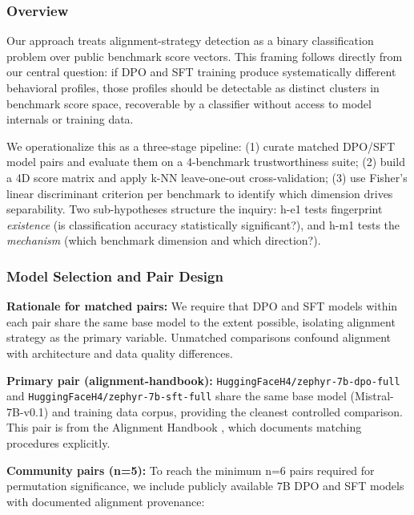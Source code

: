 
\subsubsection{Overview}

Our approach treats alignment-strategy detection as a binary classification problem over
public benchmark score vectors. This framing follows directly from our central question:
if DPO and SFT training produce systematically different behavioral profiles, those
profiles should be detectable as distinct clusters in benchmark score space, recoverable
by a classifier without access to model internals or training data.

We operationalize this as a three-stage pipeline: (1) curate matched DPO/SFT model
pairs and evaluate them on a 4-benchmark trustworthiness suite; (2) build a 4D score
matrix and apply k-NN leave-one-out cross-validation; (3) use Fisher's linear discriminant
criterion per benchmark to identify which dimension drives separability. Two sub-hypotheses
structure the inquiry: h-e1 tests fingerprint \textit{existence} (is classification accuracy
statistically significant?), and h-m1 tests the \textit{mechanism} (which benchmark dimension
and which direction?).

\subsubsection{Model Selection and Pair Design}

\textbf{Rationale for matched pairs:} We require that DPO and SFT models within each pair
share the same base model to the extent possible, isolating alignment strategy as the
primary variable. Unmatched comparisons confound alignment with architecture and data
quality differences.

\textbf{Primary pair (alignment-handbook):} \texttt{HuggingFaceH4/zephyr-7b-dpo-full} and
\texttt{HuggingFaceH4/zephyr-7b-sft-full} share the same base model (Mistral-7B-v0.1) and
training data corpus, providing the cleanest controlled comparison. This pair is from
the Alignment Handbook \citep{Tunstall2023Zephyr}, which documents matching procedures
explicitly.

\textbf{Community pairs (n=5):} To reach the minimum n=6 pairs required for permutation
significance, we include publicly available 7B DPO and SFT models with documented
alignment provenance:

